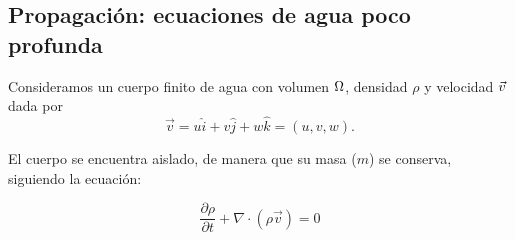 \subsection{Propagación: ecuaciones de agua poco profunda}

Consideramos un cuerpo finito de agua con volumen $\Omega$, densidad $\rho$ y velocidad $\vec{v}$ dada por
\begin{equation}
  \label{eq:v}
  \vec{v} = u \hat{i} + v \hat{j} + w \hat{k} = (u,v,w).
\end{equation}

El cuerpo se encuentra aislado, de manera que su masa ($m$) se conserva, siguiendo la ecuación:

\begin{equation}
  \frac{ \partial \rho}{\partial t} + \nabla \cdot (\rho \vec{v}) = 0
  \label{eq:continuidad}
\end{equation}

